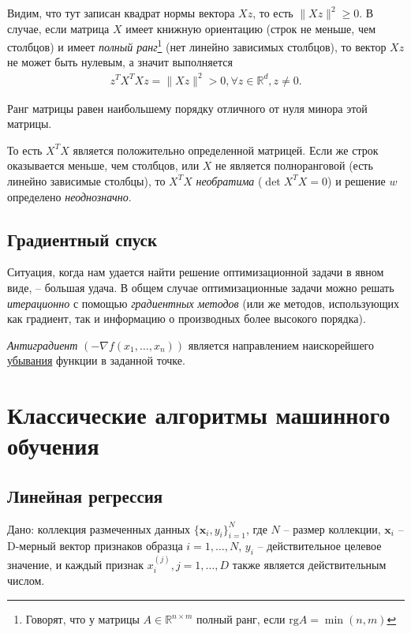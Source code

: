 \documentclass[%
	11pt,
	a4paper,
	utf8,
		]{article}
\begin{document}
Видим, что тут записан квадрат нормы вектора $ X z $, то есть $ \| X z \|^2 \geqslant 0 $. В случае, если матрица $ X $ имеет книжную ориентацию (строк не меньше, чем столбцов) и имеет \emph{полный ранг}\footnote{Говорят, что у матрицы $ A \in \mathbb{R}^{n \times m} $ полный ранг, если $ \text{rg} A = \min(n, m) $} (нет линейно зависимых столбцов), то вектор $ X z $ не может быть нулевым, а значит выполняется
\begin{align*}
	z^T X^T X z = \| X z \|^2 > 0, \forall z \in \mathbb{R}^d, z \neq 0.
\end{align*}

Ранг матрицы равен наибольшему порядку отличного от нуля минора этой матрицы. 

То есть $ X^T X $ является положительно определенной матрицей. Если же строк оказывается меньше, чем столбцов, или $ X $ не является полноранговой (есть линейно зависимые столбцы), то $ X^T X $ \emph{необратима} ($ \det X^T X = 0 $) и решение $ w $ определено \emph{неоднозначно}.

\subsection{Градиентный спуск}

Ситуация, когда нам удается найти решение оптимизационной задачи в явном виде, -- большая удача. В общем случае оптимизационные задачи можно решать \emph{итерационно} с помощью \emph{градиентных методов} (или же методов, использующих как градиент, так и информацию о производных более высокого порядка).

\emph{Антиградиент} $ (- \nabla f(x_1, \ldots, x_n)) $ является направлением наискорейшего \underline{убывания} функции в заданной точке.

\section{Классические алгоритмы машинного обучения}

\subsection{Линейная регрессия}

Дано: коллекция размеченных данных $ \{ \mathbf{x}_i, y_i \}_{i=1}^N $, где $ N $ -- размер коллекции, $ \mathbf{x}_i $ -- D-мерный вектор признаков образца $ i = 1, \ldots, N $, $ y_i $ -- действительное целевое значение, и каждый признак $ x_i^{(j)}, j = 1, \ldots, D $ также является действительным числом.
\end{document}
